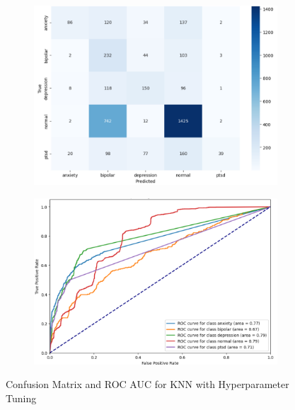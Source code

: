 \pagebreak

\begin{figure}[h!]
    \centering
    \begin{subfigure}[b]{0.49\textwidth}
        \centering
        \includegraphics[width=\textwidth]{Images/HP KNN CM.png}
        \label{LSTMROC4}  %
    \end{subfigure}
    \hfill
    \begin{subfigure}[b]{0.49\textwidth}
        \centering
        \includegraphics[width=\textwidth]{Images/HP KNN ROC.png}
        \label{LSTMROC5}  %
    \end{subfigure}
    \vspace{-1.5em}
    \caption*{Confusion Matrix and ROC AUC for KNN with Hyperparameter Tuning}
    \label{fig:hp_knn_comparison}
\end{figure}



